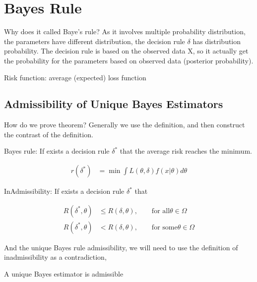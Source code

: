 \section{Bayes Rule}

Why does it called Baye's rule? As it involves multiple probability distribution, the parameters have different distribution, the decision rule $\delta$ has distribution probability. The decision rule is based on the observed data X, so it actually get the probability for the parameters based on observed data (posterior probability).

Risk function: average (expected) loss function


\subsection{Admissibility of Unique Bayes Estimators}

How do we prove theorem? Generally we use the definition, and then construct the contrast of the definition.

\begin{Definition}
Bayes rule: If exists a decision rule $\delta^{\ast}$ that the average risk reaches the minimum.

\begin{align*}
r(\delta^{\ast}) &=\min  \int L(\theta, \delta) f(x| \theta) d\theta
\end{align*}

\end{Definition}

\begin{Definition}
InAdmissibility: If exists a decision rule $\delta^{\ast}$ that 

\begin{align*}
R(\delta^{\ast}, \theta) & \leq R(\delta, \theta), \qquad \text{for all} \theta \in \Omega \\
R(\delta^{\ast}, \theta) & < R(\delta, \theta), \qquad \text{for some} \theta \in \Omega
\end{align*}

\end{Definition}

And the unique Bayes rule admissibility, we will need to use the definition of inadmissibility as a contradiction, 

\begin{Theorem}
A unique Bayes estimator is admissible

\end{Theorem}

